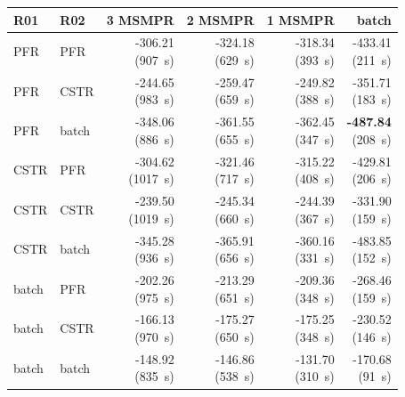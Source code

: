 \begin{tabular}{@{}llrrrr@{}}\toprule
R01 & R02 & 3 MSMPR & 2 MSMPR & 1 MSMPR & batch\\\midrule
PFR & PFR & \makecell{-306.21\\(907~s)} & \makecell{-324.18\\(629~s)} & \makecell{-318.34\\(393~s)} & \makecell{-433.41\\(211~s)} \\
PFR & CSTR & \makecell{-244.65\\(983~s)} & \makecell{-259.47\\(659~s)} & \makecell{-249.82\\(388~s)} & \makecell{-351.71\\(183~s)} \\
PFR & batch & \makecell{-348.06\\(886~s)} & \makecell{-361.55\\(655~s)} & \makecell{-362.45\\(347~s)} & \makecell{\textbf{-487.84}\\(208~s)} \\
CSTR & PFR & \makecell{-304.62\\(1017~s)} & \makecell{-321.46\\(717~s)} & \makecell{-315.22\\(408~s)} & \makecell{-429.81\\(206~s)} \\
CSTR & CSTR & \makecell{-239.50\\(1019~s)} & \makecell{-245.34\\(660~s)} & \makecell{-244.39\\(367~s)} & \makecell{-331.90\\(159~s)} \\
CSTR & batch & \makecell{-345.28\\(936~s)} & \makecell{-365.91\\(656~s)} & \makecell{-360.16\\(331~s)} & \makecell{-483.85\\(152~s)} \\
batch & PFR & \makecell{-202.26\\(975~s)} & \makecell{-213.29\\(651~s)} & \makecell{-209.36\\(348~s)} & \makecell{-268.46\\(159~s)} \\
batch & CSTR & \makecell{-166.13\\(970~s)} & \makecell{-175.27\\(650~s)} & \makecell{-175.25\\(348~s)} & \makecell{-230.52\\(146~s)} \\
batch & batch & \makecell{-148.92\\(835~s)} & \makecell{-146.86\\(538~s)} & \makecell{-131.70\\(310~s)} & \makecell{-170.68\\(91~s)} \\
\bottomrule\end{tabular}
